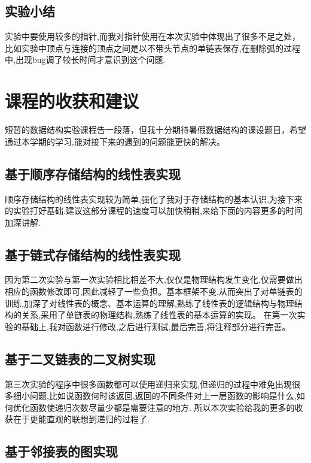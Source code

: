 \documentclass[supercite]{HustGraduPaper}
\theoremstyle{definition}
\begin{document}
\subsection{实验小结}

实验中要使用较多的指针,而我对指针使用在本次实验中体现出了很多不足之处，比如实验中顶点与连接的顶点之间是以不带头节点的单链表保存,在删除弧的过程中,出现bug调了较长时间才意识到这个问题.

\section{课程的收获和建议}
短暂的数据结构实验课程告一段落，但我十分期待暑假数据结构的课设题目，希望通过本学期的学习,能对接下来的遇到的问题能更快的解决。

\subsection{基于顺序存储结构的线性表实现}

顺序存储结构的线性表实现较为简单,强化了我对于存储结构的基本认识,为接下来的实验打好基础.建议这部分课程的速度可以加快稍稍,来给下面的内容更多的时间加深讲解.

\subsection{基于链式存储结构的线性表实现}

因为第二次实验与第一次实验相比相差不大,仅仅是物理结构发生变化,仅需要做出相应的函数修改即可,因此减轻了一些负担。基本框架不变,从而突出了对单链表的训练,加深了对线性表的概念、基本运算的理解,熟练了线性表的逻辑结构与物理结构的关系,采用了单链表的物理结构,熟练了线性表的基本运算的实现。
在第一次实验的基础上,我对函数进行修改,之后进行测试,最后完善,将注释部分进行完善。

\subsection{基于二叉链表的二叉树实现}

第三次实验的程序中很多函数都可以使用递归来实现,但递归的过程中难免出现很多细小问题,比如说函数何时该返回,返回的不同条件对上一层函数的影响是什么,如何优化函数使递归次数尽量少都是需要注意的地方. 所以本次实验给我的更多的收获在于更能直观的联想到递归的过程了.

\subsection{基于邻接表的图实现}
\end{document}
